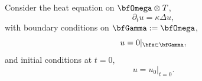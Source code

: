 
    \line
    \begin{example}
        Consider the heat equation on $\bfOmega\otimes T$,
        \begin{equation}\label{eqn:FEs in time PDE}
            \partial_{t}u  =  \kappa\Delta u,
        \end{equation}
        with boundary conditions on $\bfGamma  :=  \bfOmega$,
        \begin{equation}\label{eqn:FEs in time BC}
            u  =  0|_{\bfx \in \bfGamma},
        \end{equation}
        and initial conditions at $t  =  0$,
        \begin{equation}\label{eqn:FEs in time IC}
            u  =  u_{0}|_{t = 0}.
        \end{equation}
        

\end{example}
